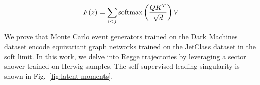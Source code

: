\begin{equation}
  F(z) = \sum_{i<j} \mathrm{softmax}\left(\frac{Q K^T}{\sqrt{d}}\right) V
  \label{eq:2}
\end{equation}

We prove that Monte Carlo event generators trained on the Dark Machines
dataset encode equivariant graph networks trained on the JetClass
dataset in the soft limit. In this work, we delve into Regge
trajectories by leveraging a sector shower trained on Herwig samples.
The self-supervised leading singularity is shown in
Fig.~\ref{fig:latent-moments}.

